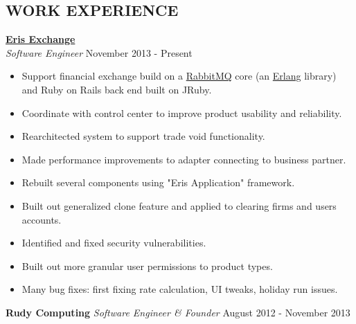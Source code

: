 \documentclass[margin]{res}
\begin{document}
\begin{resume}
\vspace{-2mm}
\section{ WORK EXPERIENCE} 
  {\bf \href{http://www.erisfutures.com/}{Eris Exchange}}\\
  {\sl Software Engineer} \hfill November 2013 - Present
\vspace{-5mm}
  \begin{itemize}
    \itemsep -2pt %
    \item Support financial exchange build on a \href{http://www.rabbitmq.com/}{RabbitMQ} core (an \href{http://www.erlang.org/}{Erlang} library) and Ruby on Rails back end built on JRuby.
    \item Coordinate with control center to improve product usability and reliability.
    \item Rearchitected system to support trade void functionality.
    \item Made performance improvements to adapter connecting to business partner.
    \item Rebuilt several components using "Eris Application" framework.
    \item Built out generalized clone feature and applied to clearing firms and users accounts.
    \item Identified and fixed security vulnerabilities.
    \item Built out more granular user permissions to product types.
    \item Many bug fixes: first fixing rate calculation, UI tweaks, holiday run issues.
  \end{itemize}

  {\bf Rudy Computing}
  {\sl Software Engineer \& Founder} \hfill August 2012 - November 2013
  

\end{resume}
\end{document}
